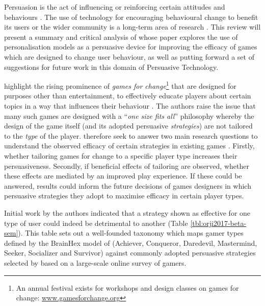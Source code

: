 \documentclass[11pt]{article}
\begin{document}
Persuasion is the act of influencing or reinforcing certain attitudes and behaviours \citep{khaled2008}. The use of technology for encouraging behavioural change to benefit its users or the wider community is a long-term area of research \citep{fogg2002}. This review will present a summary and critical analysis of \citet{orji2017} whose paper explores the use of personalisation models as a persuasive device for improving the efficacy of games which are designed to change user behaviour, as well as putting forward a set of suggestions for future work in this domain of Persuasive Technology.

\citet{orji2017} highlight the rising prominence of \textit{games for change}\footnote{An annual festival exists for workshops and design classes on games for change: \url{www.gamesforchange.org}} that are designed for purposes other than entertainment, to effectively educate players about certain topics in a way that influences their behaviour \citep{busch2015}. The authors raise the issue that many such games are designed with a ``\textit{one size fits all}'' philosophy whereby the design of the game itself (and its adopted persuasive \textit{strategies}) are not tailored to the \textit{type} of the player. \citet{orji2017} therefore seek to answer two main research questions to understand the observed efficacy of certain strategies in existing games \citep{peng2009,kaipainen2012}. Firstly, whether tailoring games for change to a specific player type increases their persuasiveness. Secondly, if beneficial effects of tailoring are observed, whether these effects are mediated by an improved play experience. If these could be answered, results could inform the future decisions of games designers in which persuasive strategies they adopt to maximise efficacy in certain player types.

Initial work by the authors indicated that a strategy shown as effective for one type of user could indeed be detrimental to another \citep{orji2013} (Table \ref{tbl:orji2017-beta-sem}). This table sets out a well-founded taxonomy which maps gamer types defined by the BrainHex model of \citet{nacke2014} (Achiever, Conqueror, Daredevil, Mastermind, Seeker, Socializer and Survivor) against commonly adopted persuasive strategies selected by \citet{gerling2014} based on a large-scale online survey of gamers. 
\end{document}
